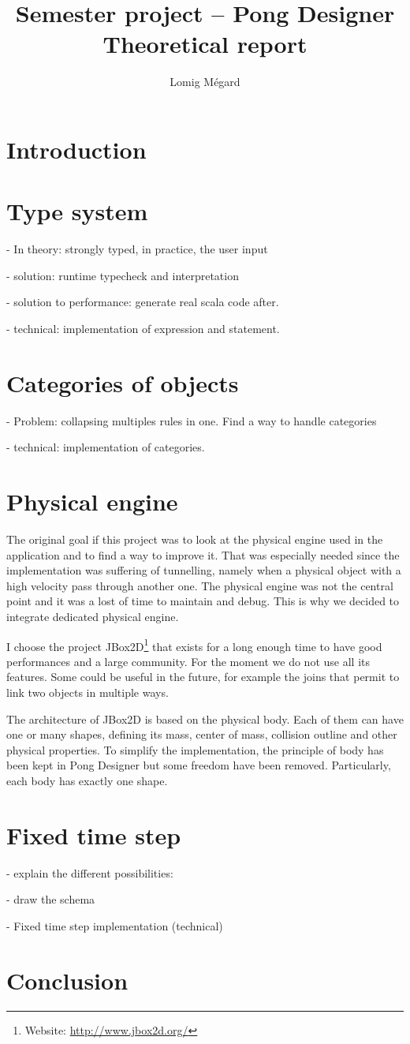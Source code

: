 \documentclass[11pt,a4paper]{article}
\title{Semester project -- Pong Designer\\Theoretical report}
\author{Lomig Mégard}
\begin{document}
\maketitle

\section{Introduction}

\section{Type system}



- In theory: strongly typed, in practice, the user input 

- solution: runtime typecheck and interpretation

- solution to performance: generate real scala code after.

- technical: implementation of expression and statement.

\section{Categories of objects}

- Problem: collapsing multiples rules in one. Find a way to handle categories

- technical: implementation of categories.

\section{Physical engine}
The original goal if this project was to look at the physical engine used in the application and to find a way to improve it. That was especially needed since the implementation was suffering of tunnelling, namely when a physical object with a high velocity pass through another one. The physical engine was not the central point and it was a lost of time to maintain and debug. This is why we decided to integrate dedicated physical engine. 

I choose the project JBox2D\footnote{Website: \url{http://www.jbox2d.org/}} that exists for a long enough time to have good performances and a large community. For the moment we do not use all its features. Some could be useful in the future, for example the joins that permit to link two objects in multiple ways.

The architecture of JBox2D is based on the physical body. Each of them can have one or many shapes, defining its mass, center of mass, collision outline and other physical properties. To simplify the implementation, the principle of body has been kept in Pong Designer but some freedom have been removed. Particularly, each body has exactly one shape.

\section{Fixed time step}

- explain the different possibilities:
  
- draw the schema

- Fixed time step implementation (technical)



\section{Conclusion}
\end{document}

